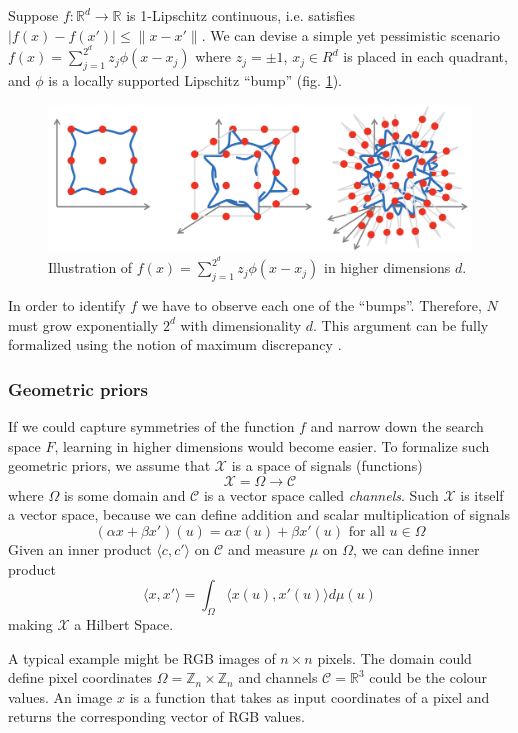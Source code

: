 \documentclass[12pt]{article}
\begin{document}
Suppose $f: \mathbb{R}^d\rightarrow\mathbb{R}$ is 1-Lipschitz continuous, i.e. satisfies $\vert f(x)-f(x')\vert \le \lVert x-x'\rVert$. We can devise a simple yet pessimistic scenario $f(x)=\sum_{j=1}^{2^d} z_j \phi(x-x_j)$ where $z_j=\pm 1$, $x_j\in R^d$ is placed in each quadrant, and $\phi$ is a locally supported Lipschitz ``bump'' (fig. \ref{fig:curse_of_dim}).
\begin{figure}[!htbp]
	\centering
	\includegraphics[width=13cm]{curse_of_dim }
	\caption{Illustration of $f(x)=\sum_{j=1}^{2^d} z_j \phi(x-x_j)$ in higher dimensions $d$.}
	\label{fig:curse_of_dim}
\end{figure}
In order to identify $f$ we have to observe each one of the ``bumps''. Therefore, $N$ must grow exponentially $2^d$ with dimensionality $d$. This argument can be fully formalized using the notion of maximum discrepancy \cite{lipschitz}.

\subsubsection{Geometric priors}

If we could capture symmetries of the function $f$ and narrow down the search space $F$, learning in higher dimensions would become easier. To formalize such geometric priors, we assume that $\mathcal{X}$ is a space of signals (functions)
\[
\mathcal{X} = \Omega \rightarrow \mathcal{C}
\]
where $\Omega$ is some domain and $\mathcal{C}$ is a vector space called \textit{channels}. Such $\mathcal{X}$ is itself a vector space, because we can define addition and scalar multiplication of signals
\[
(\alpha x + \beta x')(u) = \alpha x(u) + \beta x'(u) \text{ for all }u \in \Omega
\]
Given an inner product $\langle c,c' \rangle$ on $\mathcal{C}$ and measure $\mu$ on $\Omega$, we can define inner product
\[
\langle x,x' \rangle = \int_{\Omega} \langle x(u),x'(u) \rangle d \mu(u)
\]
making $\mathcal{X}$ a Hilbert Space.

A typical example might be RGB images of $n\times n$ pixels. The domain could define pixel coordinates $\Omega = \mathbb{Z}_n \times \mathbb{Z}_n$ and channels $\mathcal{C}=\mathbb{R}^3$ could be the colour values. An image $x$ is a function that takes as input coordinates of a pixel and returns the corresponding vector of RGB values.
\end{document}
